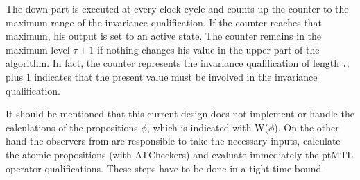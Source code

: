 The down part is executed at every clock cycle and counts up the counter to the maximum range of the invariance qualification.
If the counter reaches that maximum, his output is set to an active state. The counter remains in the maximum level $\tau+1$ if
nothing changes his value in the upper part of the algorithm. In fact, the counter represents the invariance qualification of length
$\tau$, plus 1 indicates that the present value must be involved in the invariance qualification.\newline

It should be mentioned that this current design does not implement or handle the calculations of the propositions $\phi$, 
which is indicated with W($\phi$). On the other hand the observers from \cite{RTFMBJ13} are responsible to take the necessary inputs,
calculate the atomic propositions (with ATCheckers) and evaluate immediately the ptMTL operator qualifications.  
These steps have to be done in a tight time bound.

  





